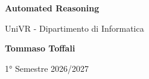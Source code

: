 \documentclass[a4paper]{article}
\theoremstyle{definition}
\theoremstyle{plain}        %
\theoremstyle{definition}   %
\theoremstyle{remark}       %
\begin{document}
\begin{titlepage}
	\begin{center}
		\vspace*{1cm}

		\Huge
		\textbf{Automated Reasoning}

		\vspace{0.5cm}
		\LARGE
		UniVR - Dipartimento di Informatica

		\vspace{1.5cm}

		\textbf{Tommaso Toffali}

		\vfill


		\vspace{0.8cm}


		1° Semestre 2026/2027
    \end{center}
\end{titlepage}

\tableofcontents
\pagebreak
\end{document}
